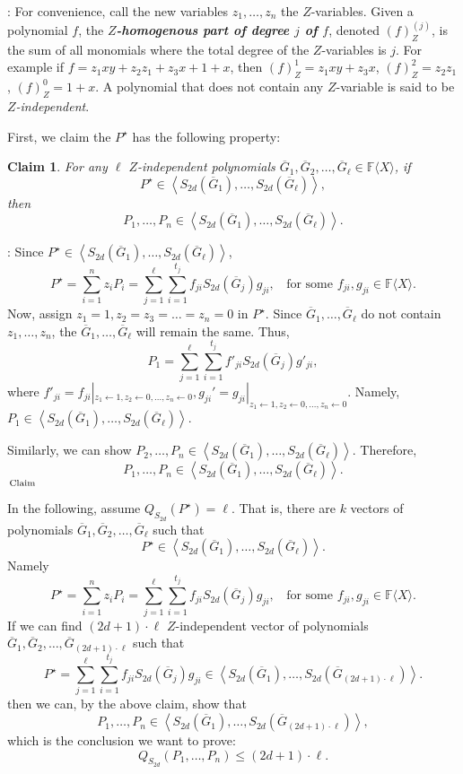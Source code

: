 \documentclass[12pt,reqno]{article}
\newtheorem*{claim*}{Claim}
\renewcommand{\dot}[1]{{#1}^\star}
\newcommand\F{\ensuremath{\mathbb F}}
\newcommand{\cd}{\cdot}
\renewcommand{\l}{\ell}
\newcommand{\freea}{\ensuremath{\F\langle X\rangle}}
\newenvironment{proof}{\QuadSpace\par\noindent{\bf Proof}:}{\EndProof\HalfSpace}
\newenvironment{proofclaim}{\QuadSpace\par\noindent{\bf Proof of claim}:}
{\vrule width 1ex height 1ex depth 0pt $_{\textrm{\,Claim}}$ \HalfSpace}
\newcommand{\QuadSpace}{\vspace{0.25\baselineskip}}
\newcommand{\HalfSpace}{\vspace{0.5\baselineskip}}
\newcommand{\EndProof}{ \hfill \vrule width 1ex height 1ex depth 0pt }
\newcommand{\nx}[1]{#1_1,\ldots,#1_{n}}
\renewcommand{\t}[1]{\overline{#1}}
\newcommand{\zd}[2]{(#1)_Z^{#2}}
\newcommand{\Number}{(2d+1)\cd\l}
\newcommand{\ideal}[1]{\ensuremath{\left\langle #1\right\rangle}}
\begin{document}
\begin{proof}
For convenience, call the new variables $\nx{z}$  the $Z$-variables. Given a polynomial $f$, the  \textbf{\emph{$Z$-homogenous part of degree $j$ of $f$}}, denoted $\zd{f}{(j)}$, is the sum of all monomials where the total degree  of the $Z$-variables is $j$. For example if $f=z_1xy+z_2z_1+z_3x+1+x$, then $\zd{f}{1}=z_1xy+z_3x$, $\zd{f}{2}=z_2z_1$, $\zd{f}{0}=1+x$.
A polynomial  that does not contain any $Z$-variable is said to be \emph{$Z$-independent}.


First, we claim the $\dot{P}$ has the following property:
\begin{claim*}
For any    $\l$ $Z$-independent polynomials $\overline  G_{1},\overline G_2,\ldots,\overline G_{\l}\in \freea $, if
$$\dot{P}\in \ideal{S_{2d}(\t G_{1}),\ldots,S_{2d}(\t G_{\l}) },$$
then
$$\nx{P}\in \ideal{  S_{2d}(\t G_{1}),\ldots,S_{2d}(\t G_{\l})}.$$
\end{claim*}
\begin{proofclaim}
Since $\dot{P}\in \ideal{S_{2d}(\t G_{1}),\ldots,S_{2d}(\t G_{\l})}$,
$$\dot{P}=\sum_{i=1}^n z_iP_i=\sum_{j=1}^\l \sum_{i=1}^{t_j} f_{ji}S_{2d}(\t G_{j})g_{ji}, ~~~~\text{for some  $f_{ji},g_{ji}\in\freea$}.$$
Now, assign   $z_1=1, z_2=z_3=\dots=z_n=0$ in $\dot{P}$. Since  $\t G_1,\ldots,\t G_{\l}$ do not  contain  $\nx{z}$, the $\t G_1,\ldots,\t G_{\l}$ will remain the same. Thus,
$$P_1=\sum_{j=1}^\l \sum_{i=1}^{t_j} f'_{ji}S_{2d}(\t G_{j})g'_{ji},$$
where $f'_{ji}=f_{ji}|_{z_1\leftarrow 1,z_2\leftarrow 0,\ldots,z_n\leftarrow 0},g_{ji}'=g_{ji}|_{z_1\leftarrow 1,z_2\leftarrow 0,\ldots,z_n\leftarrow 0}$.
Namely, $P_1\in \ideal{  S_{2d}(\t G_{1}),\ldots,S_{2d}(\t G_{\l})}$.

Similarly, we can show $P_2,\ldots,P_n\in \ideal{  S_{2d}(\t G_{1}),\ldots,S_{2d}(\t G_{\l})}$.
Therefore,  $$\nx{P}\in \ideal{  S_{2d}(\t G_{1}),\ldots,S_{2d}(\t G_{\l})}.$$
\end{proofclaim}

In the following, assume $Q_{S_{2d}}(\dot{P})=\l$.
 That is, there are   $k$ vectors of polynomials $\overline  G_{1},\overline G_2,\ldots,\overline G_{\l}$ such that
 $$\dot{P}\in \ideal{S_{2d}(\t G_{1}),\ldots,S_{2d}(\t G_{\l})}.$$
 Namely $$\dot{P}=\sum_{i=1}^n z_iP_i=\sum_{j=1}^\l \sum_{i=1}^{t_j} f_{ji}S_{2d}(\t G_{j})g_{ji}, ~~~~\text{for some  $f_{ji},g_{ji}\in\freea$}.$$
If we can find   $\Number$ $Z$-independent
 vector of polynomials $\overline  G_{1},\overline G_2,\ldots,\overline G_{\Number}$ such that
$$\dot{P}=\sum_{j=1}^\l \sum_{i=1}^{t_j} f_{ji}S_{2d}(\t G_{j})g_{ji}\in \ideal{S_{2d}(\t G_{1}),\ldots,S_{2d}(\t G_{\Number}) }.
  $$
then we can, by the above claim, show that
$$\nx{P}\in \ideal{  S_{2d}(\t G_{1}),\ldots,S_{2d}(\t G_{\Number})},$$
which is the conclusion we want to prove: $$Q_{S_{2d}}(\nx{P})\leq\Number.$$




\end{proof}
\end{document}
